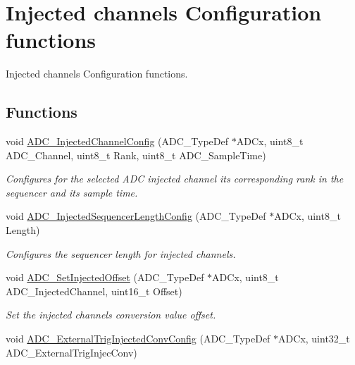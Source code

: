 \hypertarget{group___a_d_c___group6}{\section{Injected channels Configuration functions}
\label{group___a_d_c___group6}
}


Injected channels Configuration functions.  


\subsection*{Functions}
\begin{DoxyCompactItemize}
\item 
void \hyperlink{group___a_d_c___group6_gae2b44bff080184e1cf6f2cb6b9bb3e59}{A\-D\-C\-\_\-\-Injected\-Channel\-Config} (A\-D\-C\-\_\-\-Type\-Def $\ast$A\-D\-Cx, uint8\-\_\-t A\-D\-C\-\_\-\-Channel, uint8\-\_\-t Rank, uint8\-\_\-t A\-D\-C\-\_\-\-Sample\-Time)
\begin{DoxyCompactList}\small\item\em Configures for the selected A\-D\-C injected channel its corresponding rank in the sequencer and its sample time. \end{DoxyCompactList}\item 
void \hyperlink{group___a_d_c___group6_ga24eba90bc3ee955e07659a605011710d}{A\-D\-C\-\_\-\-Injected\-Sequencer\-Length\-Config} (A\-D\-C\-\_\-\-Type\-Def $\ast$A\-D\-Cx, uint8\-\_\-t Length)
\begin{DoxyCompactList}\small\item\em Configures the sequencer length for injected channels. \end{DoxyCompactList}\item 
void \hyperlink{group___a_d_c___group6_ga07a942613088ab3ecfc3d97a20475920}{A\-D\-C\-\_\-\-Set\-Injected\-Offset} (A\-D\-C\-\_\-\-Type\-Def $\ast$A\-D\-Cx, uint8\-\_\-t A\-D\-C\-\_\-\-Injected\-Channel, uint16\-\_\-t Offset)
\begin{DoxyCompactList}\small\item\em Set the injected channels conversion value offset. \end{DoxyCompactList}\item 
void \hyperlink{group___a_d_c___group6_gafc02ce1e84e96b692adf085f61a0bca6}{A\-D\-C\-\_\-\-External\-Trig\-Injected\-Conv\-Config} (A\-D\-C\-\_\-\-Type\-Def $\ast$A\-D\-Cx, uint32\-\_\-t A\-D\-C\-\_\-\-External\-Trig\-Injec\-Conv)

\end{DoxyCompactItemize}
